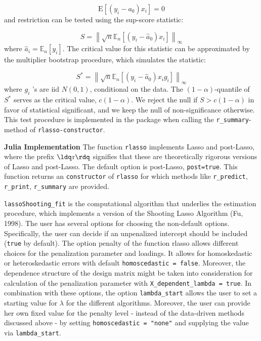 \documentclass[12pt,a4paper]{article}
\begin{document}
\[
\mathrm{E}\left[\left(y_i-a_0\right) x_i\right]=0
\]
and restriction can be tested using the sup-score statistic:

\[
S=\left\|\sqrt{n} \mathbb{E}_n\left[\left(y_i-\hat{a}_0\right) x_i\right]\right\|_{\infty}
\]
where $\hat{a}_i=\mathbb{E}_n\left[y_i\right]$. The critical value for this statistic can be approximated by the multiplier bootstrap procedure, which simulates the statistic:

\[
S^*=\left\|\sqrt{n} \mathbb{E}_n\left[\left(y_i-\hat{a}_0\right) x_i g_i\right]\right\|_{\infty}
\]
where $g_i$ 's are iid $N(0,1)$, conditional on the data. The $(1-\alpha)$-quantile of $S^*$ serves as the critical value, $c(1-\alpha)$. We reject the null if $S>c(1-\alpha)$ in favor of statistical significant, and we keep the null of non-significance otherwise. This test procedure is implemented in the package when calling the \texttt{r\_summary}-method of \texttt{rlasso-constructor}.

\textbf{Julia Implementation} The function \texttt{rlasso} implements Lasso and post-Lasso, where the prefix \ensuremath{\ldq}r\ensuremath{\rdq} signifies that these are theoretically rigorous versions of Lasso and post-Lasso. The default option is post-Lasso, \texttt{post=true}. This function returns an \texttt{constructor} of \texttt{rlasso} for which methods like \texttt{r\_predict}, \texttt{r\_print}, \texttt{r\_summary} are provided.

\texttt{lassoShooting\_fit} is the computational algorithm that underlies the estimation procedure, which implements a version of the Shooting Lasso Algorithm (Fu, 1998). The user has several options for choosing the non-default options. Specifically, the user can decide if an unpenalized intercept should be included (\texttt{true} by default). The option penalty of the function rlasso allows different choices for the penalization parameter and loadings. It allows for homoskedastic or heteroskedastic errors with default \texttt{homoscedastic = false}. Moreover, the dependence structure of the design matrix might be taken into consideration for calculation of the penalization parameter with \texttt{X\_dependent\_lambda = true}. In combination with these options, the option \texttt{lambda\_start} allows the user to set a starting value for $\lambda$ for the different algorithms. Moreover, the user can provide her own fixed value for the penalty level - instead of the data-driven methods discussed above - by setting \texttt{homoscedastic = "none"} and supplying the value via \texttt{lambda\_start}.
\end{document}
